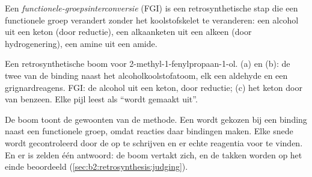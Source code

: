 \begin{definition}\label{def:b2:retrosynthesis:fgi}
Een \emph{functionele-groepsinterconversie} (FGI) is een
retrosynthetische stap die een functionele groep verandert zonder het koolstofskelet te veranderen: een alcohol
uit een keton (door reductie), een alkaanketen uit een alkeen (door hydrogenering), een amine uit een amide.
\end{definition}

\begin{omfigure}
\par\vspace{6pt}

{\small Een retrosynthetische boom voor 2-methyl-1-fenylpropaan-1-ol. (a) en (b): de twee  van
de binding  naast het alcoholkoolstofatoom, elk een aldehyde en een grignardreagens. FGI: de alcohol
uit een keton, door reductie; (c) het keton door  van benzeen. Elke pijl
leest als ``wordt gemaakt uit''.}
\end{omfigure}

De boom toont de gewoonten van de methode. Een  wordt gekozen bij een binding naast een functionele
groep, omdat reacties daar bindingen maken. Elke snede wordt gecontroleerd door de  op te schrijven en
er echte reagentia voor te vinden. En er is zelden één antwoord: de boom vertakt zich, en de takken worden
op het einde beoordeeld (\cref{sec:b2:retrosynthesis:judging}).

